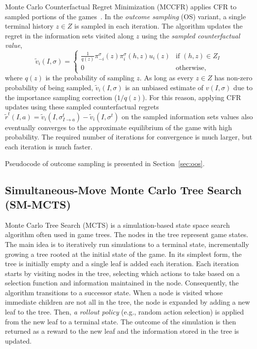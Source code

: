 Monte Carlo Counterfactual Regret Minimization (MCCFR) applies CFR to sampled portions of the games~\cite{Lanctot09Sampling}.
In the {\it outcome sampling} (OS) variant, a single terminal history $z\in Z$ is sampled in each iteration.
The algorithm updates the regret in the information sets visited along $z$ using the
{\it sampled counterfactual value},
\begin{equation*}
\tilde{v}_i(I,\sigma) = \left\{
\begin{array}{ll}
\frac{1}{q(z)} \pi^{\sigma}_{-i}(z) \pi^{\sigma}_{i}(h,z) u_i(z) & \mbox{if } (h,z) \in Z_I\\
0  & \mbox{otherwise,}
\end{array} \right.
\label{eq:scv}
\end{equation*}
where $q(z)$ is the probability of sampling $z$.
As long as every $z \in Z$ has non-zero probability of being sampled, $\tilde{v}_i(I,\sigma)$ is an unbiased estimate of $v(I,\sigma)$
due to the importance sampling correction ($1/q(z)$). For this reason, applying CFR updates using these sampled counterfactual regrets
$\tilde{r}^t(I,a) = \tilde{v}_i(I,\sigma^t_{I \rightarrow a}) - \tilde{v}_i(I,\sigma^t)$
on the sampled information sets values also eventually converges to the approximate equilibrium of the game with high probability.
The required number of iterations for convergence is much larger, but each iteration is much faster.

Pseudocode of outcome sampling is presented in Section~\ref{sec:oos}.




\subsection{Simultaneous-Move Monte Carlo Tree Search (SM-MCTS)} \label{sec:algs:smmcts}

Monte Carlo Tree Search (MCTS) is a simulation-based state space search algorithm often used
in game trees. The nodes in the tree represent game states. The main idea is to iteratively run
simulations to a terminal state, incrementally growing a tree rooted at the initial state of the game. In
its simplest form, the tree is initially empty and a single leaf is added each iteration. Each iteration
starts by visiting nodes in the tree, selecting which actions to take based on a selection function and
information maintained in the node. Consequently, the algorithm transitions to a successor state. When a
node is visited whose immediate children are not all in the tree, the node is expanded by adding a
new leaf to the tree. Then, \emph{a rollout policy} (e.g., random action selection) is applied from the new
leaf to a terminal state. The outcome of the simulation is then returned as a reward to the new leaf
and the information stored in the tree is updated.

